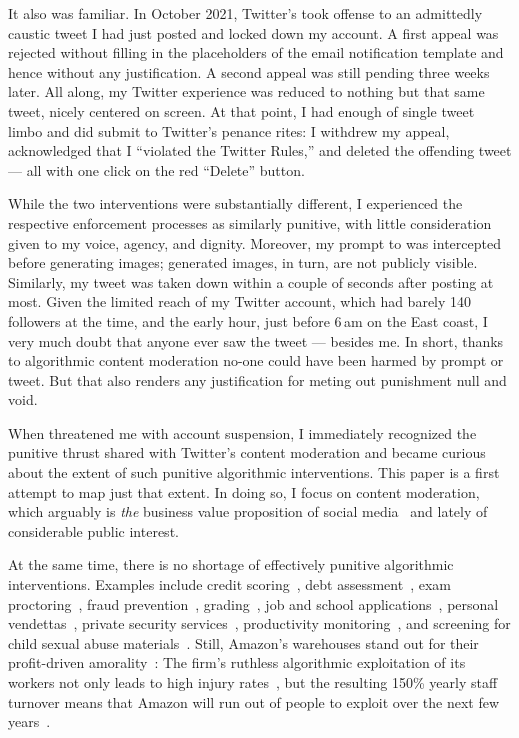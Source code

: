 It also was familiar. In October 2021, Twitter's \AI{} took offense to an
admittedly caustic tweet I had just posted and locked down my account. A first
appeal was rejected without filling in the placeholders of the email
notification template and hence without any justification. A second appeal was
still pending three weeks later. All along, my Twitter experience was reduced to
nothing but that same tweet, nicely centered on screen. At that point, I had
enough of single tweet limbo and did submit to Twitter's penance rites: I
withdrew my appeal, acknowledged that I ``violated the Twitter Rules,'' and
deleted the offending tweet --- all with one click on the red ``Delete'' button.

While the two interventions were substantially different, I experienced the
respective enforcement processes as similarly punitive, with little
consideration given to my voice, agency, and dignity. Moreover, my prompt to
\DALLE{} was intercepted before generating images; generated images, in turn, are
not publicly visible. Similarly, my tweet was taken down within a couple of
seconds after posting at most. Given the limited reach of my Twitter account,
which had barely 140 followers at the time, and the early hour, just before
6$\,$am on the East coast, I very much doubt that anyone ever saw the tweet ---
besides me. In short, thanks to algorithmic content moderation no-one could have
been harmed by prompt or tweet. But that also renders any justification for
meting out punishment null and void.

When \DALLE{} threatened me with account suspension, I immediately recognized
the punitive thrust shared with Twitter's content moderation and became curious
about the extent of such punitive algorithmic interventions. This paper is a
first attempt to map just that extent. In doing so, I focus on content
moderation, which arguably is \emph{the} business value proposition of social
media~\cite{Masnick2022a,Patel2022a} and lately of considerable public interest.

At the same time, there is no shortage of effectively punitive algorithmic
interventions. Examples include credit scoring~\cite{Anonymous2018}, debt
assessment~\cite{Yampolskiy2015}, exam proctoring~\cite{FrancisWard2021b}, fraud
prevention~\cite{Kugel2022}, grading~\cite{Lam2020}, job and school
applications~\cite{Anonymous2016,Hall2012,Hall2020a,Stockton2020}, personal
vendettas~\cite{Casovan2022}, private security services~\cite{HaoSwart2022},
productivity
monitoring~\cite{Covert2022,HaoFreischlad2022,KantorSundaramea2022,Rosenblat2018},
and screening for child sexual abuse materials~\cite{Atherton2022a}. Still,
Amazon's warehouses stand out for their profit-driven
amorality~\cite{KantorWeiseea2021,Lennard2020}: The firm's ruthless algorithmic
exploitation of its workers not only leads to high injury
rates~\cite{Brown2019a,Clark2023,Sainato2021}, but the resulting 150\% yearly
staff turnover means that Amazon will run out of people to exploit over the next
few years~\cite{Sainato2022}.

